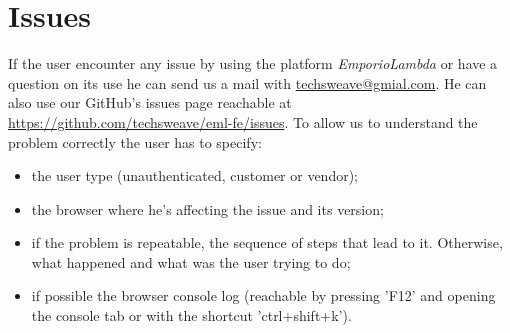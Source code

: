\section{Issues}
If the user encounter any issue by using the platform \textit{EmporioLambda} or have a question on its use he can send us a mail with \href{mailto:techsweave@gmial.com}{techsweave@gmial.com}. He can also use our GitHub's issues page reachable at \href{https://github.com/techsweave/eml-fe/issues}{https://github.com/techsweave/eml-fe/issues}.
To allow us to understand the problem correctly the user has to specify:
\begin{itemize}
    \item the user type (unauthenticated, customer or vendor);
    \item the browser where he's affecting the issue and its version;
    \item if the problem is repeatable, the sequence of steps that lead to it. Otherwise, what happened and what was the user trying to do;
    \item if possible the browser console log (reachable by pressing {\selectfont 'F12'} and opening the console tab or with the shortcut {\selectfont 'ctrl+shift+k'}).

\end{itemize}
